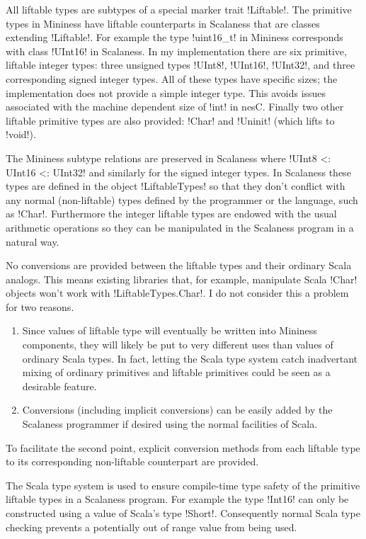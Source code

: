 All liftable types are subtypes of a special marker trait !Liftable!. The primitive types in
Mininess have liftable counterparts in Scalaness that are classes extending !Liftable!. For
example the type !uint16\_t! in Mininess corresponds with class !UInt16! in Scalaness. In my
implementation there are six primitive, liftable integer types: three unsigned types !UInt8!,
!UInt16!, !UInt32!, and three corresponding signed integer types. All of these types have
specific sizes; the implementation does not provide a simple integer type. This avoids issues
associated with the machine dependent size of !int! in nesC. Finally two other liftable
primitive types are also provided: !Char! and !Uninit! (which lifts to !void!).

The Mininess subtype relations are preserved in Scalaness where !UInt8 <: UInt16 <: UInt32! and
similarly for the signed integer types. In Scalaness these types are defined in the object
!LiftableTypes! so that they don't conflict with any normal (non-liftable) types defined by the
programmer or the language, such as !Char!. Furthermore the integer liftable types are endowed
with the usual arithmetic operations so they can be manipulated in the Scalaness program in a
natural way.

No conversions are provided between the liftable types and their ordinary Scala analogs. This
means existing libraries that, for example, manipulate Scala !Char! objects won't work with
!LiftableTypes.Char!. I do not consider this a problem for two reasons.
\begin{enumerate}
\item Since values of liftable type will eventually be written into Mininess components, they
  will likely be put to very different uses than values of ordinary Scala types. In fact,
  letting the Scala type system catch inadvertant mixing of ordinary primitives and liftable
  primitives could be seen as a desirable feature.
\item Conversions (including implicit conversions) can be easily added by the Scalaness
  programmer if desired using the normal facilities of Scala.
\end{enumerate}

To facilitate the second point, explicit conversion methods from each liftable type to its
corresponding non-liftable counterpart are provided.

The Scala type system is used to ensure compile-time type safety of the primitive liftable types
in a Scalaness program. For example the type !Int16! can only be constructed using a value of
Scala's type !Short!. Consequently normal Scala type checking prevents a potentially out of
range value from being used.

